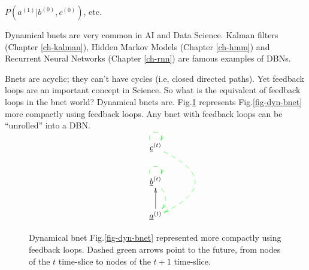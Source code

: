 $P(a^{(1)}|b^{(0)}, c^{(0)})$, etc.

Dynamical bnets
are very common
in AI and Data Science.
Kalman filters (Chapter \ref{ch-kalman}),
Hidden Markov Models (Chapter \ref{ch-hmm})
and
Recurrent Neural Networks 
(Chapter \ref{ch-rnn})
are famous examples of DBNs.

Bnets are acyclic; they can't have cycles
(i.e, closed directed paths).
Yet feedback loops are an important
concept in Science. So what is
the equivalent of feedback loops in the
bnet world? Dynamical bnets are.
Fig.\ref{fig-dyn-bnet-compact}
represents
Fig.\ref{fig-dyn-bnet} more 
compactly using feedback loops. 
Any bnet with feedback loops
can be \enquote{unrolled} into a DBN.


\begin{figure}[h!]
$$
\xymatrix{
\rvc^{(t)}
\ar@/^4pc/@[green]@{-->}[dd]
\ar@(ul,ur)@[green]@{-->}[]
\\
\rvb^{(t)}
\ar@/^1pc/@[green]@{-->}[d]
\ar@(ul,ur)@[green]@{-->}[]
\\
\rva^{(t)}\ar[u]
}$$
\caption{
Dynamical bnet Fig.\ref{fig-dyn-bnet}
represented 
more compactly using feedback loops.
Dashed green arrows
point to the future, from nodes of the $t$ time-slice
to nodes of the $t+1$ time-slice.
}
\label{fig-dyn-bnet-compact}
\end{figure}
